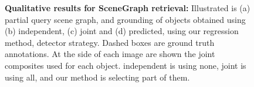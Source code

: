 \documentclass[runningheads]{llncs}
\begin{document}
\begin{figure}[H]
    \hspace{0em}

    \caption{{\bf Qualitative results for SceneGraph retrieval:} Illustrated is (a) partial query scene graph, and grounding of objects obtained using (b) independent, (c) joint and (d) predicted, using our regression method, detector strategy. Dashed boxes are ground truth annotations. At the side of each image are shown the joint composites used for each object. independent is using none, joint is using all, and our method is selecting part of them.}%
    \label{fig:scene_graph_retrieval}%
\vspace*{-\baselineskip}
\vspace*{-\baselineskip}
\end{figure}
\end{document}
